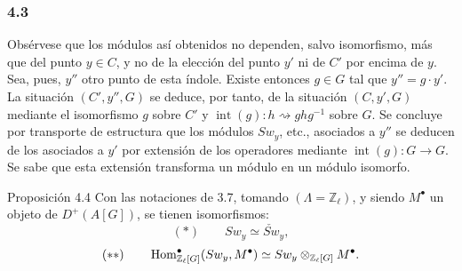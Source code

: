 \subsubsection*{4.3}

Obsérvese que los módulos así obtenidos no dependen, salvo isomorfismo, más que del punto $y\in C$, y no de la elección del punto $y'$ ni de $C'$ por encima de $y$. Sea, pues, $y''$ otro punto de esta índole. Existe entonces $g\in G$ tal que $y''=g\cdot y'$. La situación $(C',y'',G)$ se deduce, por tanto, de la situación $(C,y',G)$ mediante el isomorfismo $g$ sobre $C'$ y $\operatorname{int}(g):h\rightsquigarrow ghg^{-1}$ sobre $G$. Se concluye por transporte de estructura que los módulos $Sw_y$, etc., asociados a $y''$ se deducen de los asociados a $y'$ por extensión de los operadores mediante $\operatorname{int}(g):G\to G$. Se sabe que esta extensión transforma un módulo en un módulo isomorfo.

\begin{statement}{Proposición 4.4}
Con las notaciones de 3.7, tomando $(\Lambda=\mathbb Z_\ell)$, y siendo $M^\bullet$ un objeto de $D^+(A[G])$, se tienen isomorfismos:
\[
(*)\qquad Sw_y\simeq \check{Sw}_y,
\]
\[
(**)\qquad
\operatorname{Hom}^\bullet_{\mathbb Z_\ell[G]}(Sw_y,M^\bullet)
\simeq Sw_y\otimes_{\mathbb Z_\ell[G]}M^\bullet.
\]
\end{statement}
